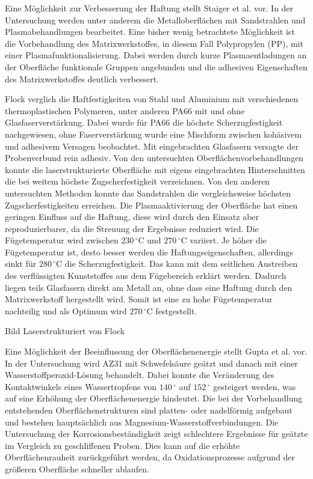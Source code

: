 Eine Möglichkeit zur Verbesserung der Haftung stellt Staiger et al. \cite{Staiger.2014} vor. In der Untersuchung werden unter anderem die Metalloberflächen mit Sandstrahlen und Plasmabehandlungen bearbeitet. Eine bisher wenig betrachtete Möglichkeit ist die Vorbehandlung des Matrixwerkstoffes, in diesem Fall Polypropylen (PP), mit einer Plasmafunktionalisierung. Dabei werden durch kurze Plasmaentladungen an der Oberfläche funktionale Gruppen angebunden und die adhesiven Eigenschaften des Matrixwerkstoffes deutlich verbessert.

Flock \cite{Flock.b} verglich die Haftfestigkeiten von Stahl und Aluminium mit verschiedenen thermoplastischen Polymeren, unter anderen PA66 mit und ohne Glasfaserverstärkung. Dabei wurde für PA66 die höchste Scherzugfestigkeit nachgewiesen, ohne Faserverstärkung wurde eine Mischform zwischen kohäsivem und adhesivem Versagen beobachtet. Mit eingebrachten Glasfasern versagte der Probenverbund rein adhesiv. Von den untersuchten Oberflächenvorbehandlungen konnte die laserstrukturierte Oberfläche mit eigens eingebrachten Hinterschnitten die bei weitem höchste Zugscherfestigkeit verzeichnen. Von den anderen untersuchten Methoden konnte das Sandstrahlen die vergleichsweise höchsten Zugscherfestigkeiten erreichen. Die Plasmaaktivierung der Oberfläche hat einen geringen Einfluss auf die Haftung, diese wird durch den Einsatz aber reproduzierbarer, da die Streuung der Ergebnisse reduziert wird. Die Fügetemperatur wird zwischen $230 \, ^\circ \text{C}$ und $270 \, ^\circ \text{C}$ variiert. Je höher die Fügetemperatur ist, desto besser werden die Haftungseigenschaften, allerdings sinkt für $280 \, ^\circ \text{C}$ die Scherzugfestigkeit. Das kann mit dem seitlichen Austreiben des verflüssigten Kunststoffes aus dem Fügebereich erklärt werden. Dadurch liegen teils Glasfasern direkt am Metall an, ohne dass eine Haftung durch den Matrixwerkstoff hergestellt wird. Somit ist eine zu hohe Fügetemperatur nachteilig und als Optimum wird $270 \, ^\circ \text{C}$ festgestellt.

Bild Laserstrukturiert von Flock

Eine Möglichkeit der Beeinflussung der Oberflächenenergie stellt Gupta et al. \cite{Gupta.2012} vor. In der Untersuchung wird AZ31 mit Schwefelsäure geätzt und danach mit einer Wasserstoffperoxid-Lösung behandelt. Dabei konnte die Veränderung des Kontaktwinkels eines Wassertropfens von $140\, ^\circ$ auf $152 \, ^\circ$ gesteigert werden, was auf eine Erhöhung der Oberflächenenergie hindeutet. Die bei der Vorbehandlung entstehenden Oberflächenstrukturen sind platten- oder nadelförmig aufgebaut und bestehen hauptsächlich aus Magnesium-Wasserstoffverbindungen. Die Untersuchung der Korrosionsbeständigkeit zeigt schlechtere Ergebnisse für geätzte im Vergleich zu geschliffenen Proben. Dies kann auf die erhöhte Oberflächenrauheit zurückgeführt werden, da Oxidationsprozesse aufgrund der größeren Oberfläche schneller ablaufen.

